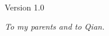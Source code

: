 
\hfill
\vfill
\noindent\myName \\
\textit{\let\\\relax\myTitle} \\
\textcopyright\ \myYear \\
Version 1.0

\newpage
\vspace*{\fill}
\begin{flushright}
	\textit{To my parents and to Qian.}
\end{flushright}
\vspace*{\fill}
